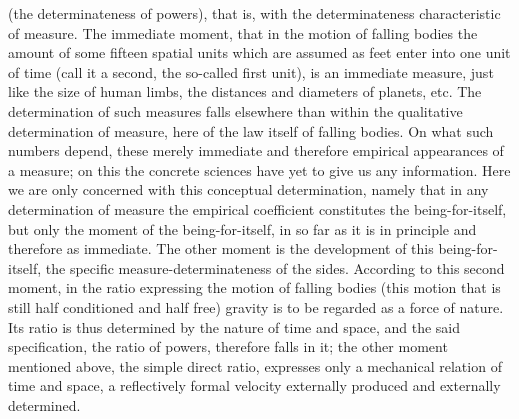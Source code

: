 (the determinateness of powers),
that is, with the determinateness characteristic of measure.
The immediate moment, that in the motion of falling bodies
the amount of some fifteen spatial units
which are assumed as feet enter into one unit of time
(call it a second, the so-called first unit),
is an immediate measure, just like the size of human limbs,
the distances and diameters of planets, etc.
The determination of such measures falls elsewhere
than within the qualitative determination of measure,
here of the law itself of falling bodies.
On what such numbers depend, these merely immediate
and therefore empirical appearances of a measure;
on this the concrete sciences have yet to give us any information.
Here we are only concerned with this conceptual determination,
namely that in any determination of measure
the empirical coefficient constitutes the being-for-itself,
but only the moment of the being-for-itself,
in so far as it is in principle and therefore as immediate.
The other moment is the development of this being-for-itself,
the specific measure-determinateness of the sides.
According to this second moment,
in the ratio expressing the motion of falling bodies
(this motion that is still half conditioned and half free)
gravity is to be regarded as a force of nature.
Its ratio is thus determined by the nature of time and space,
and the said specification, the ratio of powers, therefore falls in it;
the other moment mentioned above, the simple direct ratio,
expresses only a mechanical relation of time and space,
a reflectively formal velocity externally produced
and externally determined.

